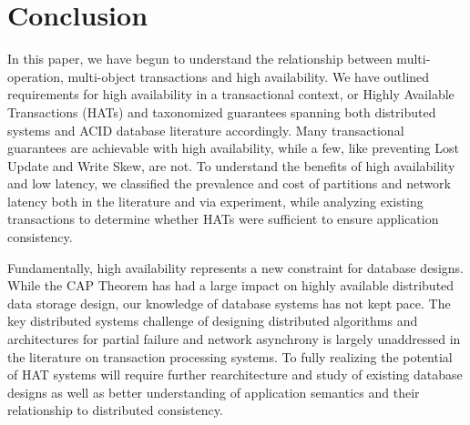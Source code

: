 
\section{Conclusion}

In this paper, we have begun to understand the relationship between
multi-operation, multi-object transactions and high availability. We
have outlined requirements for high availability in a transactional
context, or Highly Available Transactions (HATs) and taxonomized
guarantees spanning both distributed systems and ACID database
literature accordingly. Many transactional guarantees are achievable
with high availability, while a few, like preventing Lost Update and
Write Skew, are not. To understand the benefits of high availability
and low latency, we classified the prevalence and cost of partitions
and network latency both in the literature and via experiment, while
analyzing existing transactions to determine whether HATs were
sufficient to ensure application consistency.

Fundamentally, high availability represents a new constraint for
database designs. While the CAP Theorem has had a large impact on
highly available distributed data storage design, our knowledge of
database systems has not kept pace. The key distributed systems
challenge of designing distributed algorithms and architectures for
partial failure and network asynchrony is largely unaddressed in the
literature on transaction processing systems. To fully realizing the
potential of HAT systems will require further rearchitecture and study
of existing database designs as well as better understanding of
application semantics and their relationship to distributed
consistency.
